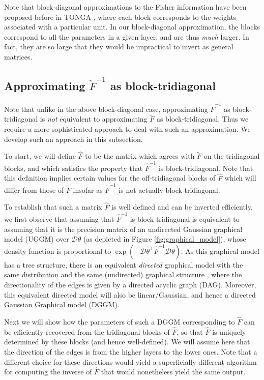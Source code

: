 \documentclass[12pt]{article}
\newcommand{\deriv}{\mathcal{D}}
\begin{document}
Note that block-diagonal approximations to the Fisher information have been proposed before in TONGA \citep{TONGA}, where each block corresponds to the weights associated with a particular unit.  In our block-diagonal approximation, the blocks correspond to all the parameters in a given layer, and are thus \emph{much} larger.  In fact, they are so large that they would be impractical to invert as general matrices.


\subsection{Approximating $\tilde{F}^{-1}$ as block-tridiagonal}
\label{sec:blocktridiag_approx}

Note that unlike in the above block-diagonal case, approximating $\tilde{F}^{-1}$ as block-tridiagonal is \emph{not} equivalent to approximating $\tilde{F}$ as block-tridiagonal.  Thus we require a more sophisticated approach to deal with such an approximation.  We develop such an approach in this subsection.

To start, we will define $\hat{F}$ to be the matrix which agrees with $\tilde{F}$ on the tridiagonal blocks, and which satisfies the property that $\hat{F}^{-1}$ is block-tridiagonal.  Note that this definition implies certain values for the off-tridiagonal blocks of $\hat{F}$ which will differ from those of $\tilde{F}$ insofar as $\tilde{F}^{-1}$ is not actually block-tridiagonal.

To establish that such a matrix $\hat{F}$ is well defined and can be inverted efficiently, we first observe that assuming that $\hat{F}^{-1}$ is block-tridiagonal is equivalent to assuming that it is the precision matrix of an undirected Gaussian graphical model (UGGM) over $\deriv\theta$ (as depicted in Figure \ref{fig:graphical_model}), whose density function is proportional to $\exp(-\deriv\theta^\top \hat{F}^{-1} \deriv\theta)$.  As this graphical model has a tree structure, there is an equivalent \emph{directed} graphical model with the same distribution and the same (undirected) graphical structure \citep[e.g.][]{bishop}, where the directionality of the edges is given by a directed acyclic graph (DAG).  Moreover, this equivalent directed model will also be linear/Gaussian, and hence a directed Gaussian Graphical model (DGGM).

Next we will show how the parameters of such a DGGM corresponding to $\hat{F}$ can be efficiently recovered from the tridiagonal blocks of $\hat{F}$, so that $\hat{F}$ is uniquely determined by these blocks (and hence well-defined).  We will assume here that the direction of the edges is from the higher layers to the lower ones.  Note that a different choice for these directions would yield a superficially different algorithm for computing the inverse of $\hat{F}$ that would nonetheless yield the same output.
\end{document}
